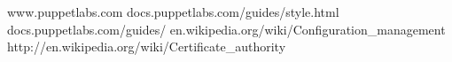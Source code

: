 \begin{thebibliography}{99}

www.puppetlabs.com
docs.puppetlabs.com/guides/style.html
docs.puppetlabs.com/guides/
en.wikipedia.org/wiki/Configuration\_management
http://en.wikipedia.org/wiki/Certificate_authority

\end{thebibliography}
